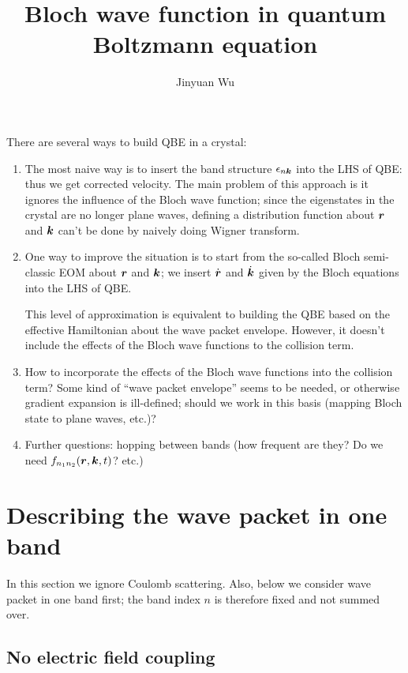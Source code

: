 \documentclass[hyperref, a4paper]{article}
\title{Bloch wave function in quantum Boltzmann equation}
\author{Jinyuan Wu}
\begin{document}
\maketitle

There are several ways to build QBE in a crystal: 
\begin{enumerate}
    \item The most naive way is to insert the 
    band structure $\epsilon_{n \vb*{k}}$ into the LHS of QBE: 
    thus we get corrected velocity.
    The main problem of this approach is it  
    ignores the influence of the Bloch wave function; 
    since the eigenstates in the crystal are no longer plane waves, 
    defining a distribution function about $\vb*{r}$ and $\vb*{k}$
    can't be done by naively doing Wigner transform.
    \item One way to improve the situation is to 
    start from the so-called Bloch semi-classic EOM about $\vb*{r}$ and $\vb*{k}$; 
    we insert $\dot{\vb*{r}}$ and $\dot{\vb*{k}}$ given by the Bloch equations 
    into the LHS of QBE. 

    This level of approximation is equivalent to building the QBE 
    based on the effective Hamiltonian about the wave packet envelope. 
    However, it doesn't include the effects of the Bloch wave functions 
    to the collision term. 

    \item How to incorporate the effects of the Bloch wave functions into the collision term?
    Some kind of ``wave packet envelope'' seems to be needed, 
    or otherwise gradient expansion is ill-defined; 
    should we work in this basis (mapping Bloch state to plane waves, etc.)?

    \item Further questions: hopping between bands 
        (how frequent are they? Do we need $f_{n_1 n_2}(\vb*{r}, \vb*{k}, t)$? etc.)
\end{enumerate}

\section{Describing the wave packet in one band}

In this section we ignore Coulomb scattering.
Also, below we consider wave packet in one band first; 
the band index $n$ is therefore fixed and not summed over.

\subsection{No electric field coupling}
\end{document}
